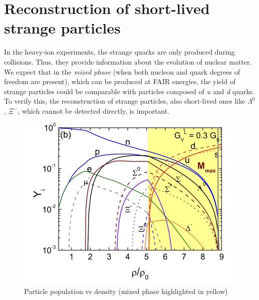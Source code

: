 \section{Reconstruction of short-lived strange particles}
In the heavy-ion experiments, the strange quarks are only produced during collisions. Thus, they provide information about the evolution of nuclear matter. We expect \cite{deconfinement} that in the \emph{mixed phase} (when both nucleon and quark degrees of freedom are present), which can be produced at FAIR energies, the yield of strange particles could be comparable with particles composed of \emph{u} and \emph{d} quarks. To verify this, the reconstruction of strange particles, also short-lived ones  like \textit{$\Lambda^0$}, \textit{$\Xi^-$}, \PKzS which cannot be detected directly, is important.

\begin{figure}[H]
    \centering
    \includegraphics[width=.6\textwidth]{img/mixed_phase.png}
    \caption{Particle population vs density (mixed phase highlighted in yellow) \cite{deconfinement}}
    \label{cbm_setup}
\end{figure}